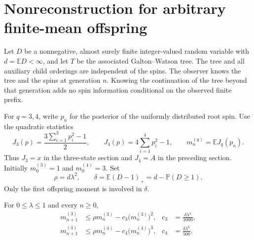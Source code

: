 \section{Nonreconstruction for arbitrary finite-mean offspring}
\label{sec:finite-mean-nonreconstruction}

Let $D$ be a nonnegative, almost surely finite integer-valued random
variable with $d=\mathbb E D<\infty$, and let $T$ be the associated
Galton--Watson tree.  The tree and all auxiliary child orderings are
independent of the spins.  The observer knows the tree and the spins at
generation $n$.  Knowing the continuation of the tree beyond that
generation adds no spin information conditional on the observed finite
prefix.

For $q=3,4$, write $p_n$ for the posterior of the uniformly distributed
root spin.  Use the quadratic statistics
\[
 J_3(p)=\frac{3\sum_{i=1}^3p_i^2-1}{2},\qquad
 J_4(p)=4\sum_{i=1}^4p_i^2-1,
 \qquad m_n^{(q)}=\mathbb E J_q(p_n).
\]
Thus $J_3=x$ in the three-state section and $J_4=A$ in the preceding
section.  Initially $m_0^{(3)}=1$ and $m_0^{(4)}=3$.  Set
\begin{equation}
 \rho=d\lambda^2,\qquad
 \delta=\mathbb E(D-1)_+=d-\mathbb P(D\ge1).
 \label{eq:gw-rho-delta}
\end{equation}
Only the first offspring moment is involved in $\delta$.

\begin{proposition}
\label{prop:gw-drift}
For $0\le\lambda\le1$ and every $n\ge0$,
\begin{align}
 m_{n+1}^{(3)}
 &\le \rho m_n^{(3)}-c_3\bigl(m_n^{(3)}\bigr)^2,
 &c_3&=\frac{\delta\lambda^4}{1000},
 \label{eq:gw-q3-drift}\\
 m_{n+1}^{(4)}
 &\le \rho m_n^{(4)}-c_4\bigl(m_n^{(4)}\bigr)^3,
 &c_4&=\frac{\delta\lambda^6}{500}.
 \label{eq:gw-q4-drift}
\end{align}
\end{proposition}

